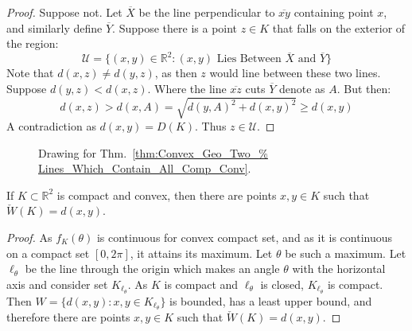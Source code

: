         \begin{proof}
            Suppose not. Let $\overline{X}$ be the line perpendicular to
            $\overline{xy}$ containing point $x$, and similarly define
            $\overline{Y}$. Suppose there is a point $z\in K$ that falls
            on the exterior of the region:
            \begin{equation}
                \mathcal{U}=\{(x,y)\in\mathbb{R}^{2}:
                    (x,y)\textrm{ Lies Between }\overline{X}
                    \textrm{ and }\overline{Y}\}
            \end{equation}
            Note that $d(x,z)\ne d(y,z)$, as then $z$ would line
            between these two lines. Suppose $d(y,z)<d(x,z)$. Where
            the line $\overline{xz}$ cuts $\overline{Y}$ denote as
            $A$. But then:
            \begin{equation}
                d(x,z)>d(x,A)=
                \sqrt{d(y,A)^2+d(x,y)^2}\geq
                d(x,y)
            \end{equation}
            A contradiction as $d(x,y)=D(K)$. Thus $z\in\mathcal{U}$.
        \end{proof}
        \begin{figure}[H]
            \centering
            \captionsetup{type=figure}
            
            \caption{Drawing for Thm.~\ref{thm:Convex_Geo_Two_%
                Lines_Which_Contain_All_Comp_Conv}.}
            \label{fig:Convex_Geo_Two_Lines_Which_Contain_All_Comp_Conv}
        \end{figure}
        \begin{theorem}
            If $K\subset \mathbb{R}^2$ is compact and convex,
            then there are points $x,y\in K$ such that
            $\check{W}(K)=d(x,y)$.
        \end{theorem}
        \begin{proof}
        As $f_K(\theta)$ is continuous for convex compact set, and as it
        is continuous on a compact set $[0,2\pi]$, it attains its maximum.
        Let $\theta$ be such a maximum. Let $\ell_{\theta}$ be the line
        through the origin which makes an angle $\theta$ with the
        horizontal axis and consider set $K_{\ell_{\theta}}$. As $K$ is
        compact and $\ell_{\theta}$ is closed, $K_{\ell_{\theta}}$ is
        compact. Then $W=\{d(x,y):x,y\in K_{\ell_{\theta}}\}$ is bounded,
        has a least upper bound, and therefore there are points
        $x,y\in K$ such that $\check{W}(K)=d(x,y)$.
        \end{proof}
